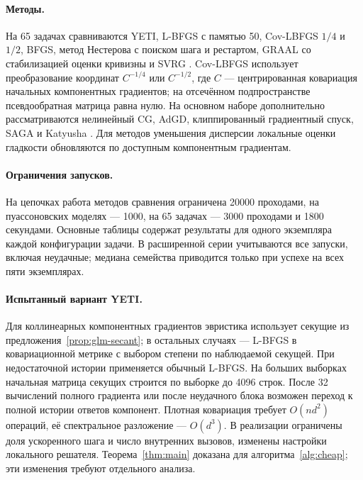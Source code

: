 \paragraph{Методы.}
На 65 задачах сравниваются YETI, L-BFGS с памятью 50,
Cov-LBFGS $1/4$ и $1/2$, BFGS, метод Нестерова с поиском шага и рестартом,
GRAAL со стабилизацией оценки кривизны и SVRG
\citep{liu1989lbfgs,nocedal2006,borodich2026graal,johnson2013svrg}.
Cov-LBFGS использует преобразование координат $C^{-1/4}$ или $C^{-1/2}$,
где $C$ --- центрированная ковариация начальных компонентных градиентов;
на отсечённом подпространстве псевдообратная матрица равна нулю.
На основном наборе дополнительно рассматриваются нелинейный CG,
AdGD, клиппированный градиентный спуск, SAGA и Katyusha
\citep{malitsky2020adgd,zhang2019gradient,defazio2014saga,allenzhu2018katyusha}.
Для методов уменьшения дисперсии локальные оценки гладкости
обновляются по доступным компонентным градиентам.

\paragraph{Ограничения запусков.}
На цепочках работа методов сравнения ограничена 20000 проходами,
на пуассоновских моделях --- 1000, на 65 задачах ---
3000 проходами и 1800 секундами.
Основные таблицы содержат результаты для одного экземпляра каждой конфигурации задачи.
В расширенной серии учитываются все запуски, включая неудачные;
медиана семейства приводится только при успехе на всех пяти экземплярах.

\paragraph{Испытанный вариант YETI.}
Для коллинеарных компонентных градиентов эвристика использует секущие
из предложения~\ref{prop:glm-secant}; в остальных случаях ---
L-BFGS в ковариационной метрике с выбором степени по наблюдаемой секущей.
При недостаточной истории применяется обычный L-BFGS.
На больших выборках начальная матрица секущих строится по выборке
до 4096 строк. После 32 вычислений полного градиента или после неудачного блока
возможен переход к полной истории ответов компонент.
Плотная ковариация требует $O(nd^2)$ операций,
её спектральное разложение --- $O(d^3)$.
В реализации ограничены доля ускоренного шага и число внутренних
вызовов, изменены настройки локального решателя.
Теорема~\ref{thm:main} доказана для алгоритма~\ref{alg:cheap};
эти изменения требуют отдельного анализа.

